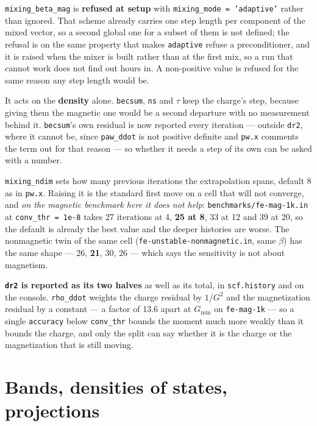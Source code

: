 \documentclass[11pt,a4paper]{article}
\newcommand{\code}[1]{\texttt{\small #1}}
\begin{document}
\begin{refuses}
\code{mixing\_beta\_mag} is \textbf{refused at setup} with
\code{mixing\_mode = 'adaptive'} rather than ignored. That scheme already
carries one step length per component of the mixed vector, so a second global one
for a subset of them is not defined; the refusal is on the same property that
makes \code{adaptive} refuse a preconditioner, and it is raised when the mixer is
built rather than at the first mix, so a run that cannot work does not find out
hours in. A non-positive value is refused for the same reason any step length
would be.

It acts on the \textbf{density} alone. \code{becsum}, \code{ns} and $\tau$ keep
the charge's step, because giving them the magnetic one would be a second
departure with no measurement behind it. \code{becsum}'s own residual is now
reported every iteration --- outside \code{dr2}, where it cannot be, since
\code{paw\_ddot} is not positive definite and \code{pw.x} comments the term out
for that reason --- so whether it needs a step of its own can be asked with a
number.
\end{refuses}

\code{mixing\_ndim} sets how many previous iterations the extrapolation spans,
default 8 as in \code{pw.x}. Raising it is the standard first move on a cell
that will not converge, and \emph{on the magnetic benchmark here it does not
help}: \code{benchmarks/fe-mag-1k.in} at \code{conv\_thr = 1e-8} takes 27
iterations at 4, \textbf{25 at 8}, 33 at 12 and 39 at 20, so the default is
already the best value and the deeper histories are worse. The nonmagnetic twin
of the same cell (\code{fe-unstable-nonmagnetic.in}, same $\beta$) has the same
shape --- 26, \textbf{21}, 30, 26 --- which says the sensitivity is not about
magnetism.

\textbf{\code{dr2} is reported as its two halves} as well as its total, in
\code{scf.history} and on the console. \code{rho\_ddot} weights the charge
residual by $1/G^2$ and the magnetization residual by a constant --- a factor of
13.6 apart at $G_{\min}$ on \code{fe-mag-1k} --- so a single \code{accuracy}
below \code{conv\_thr} bounds the moment much more weakly than it bounds the
charge, and only the split can say whether it is the charge or the magnetization
that is still moving.

\section{Bands, densities of states, projections}
\end{document}
